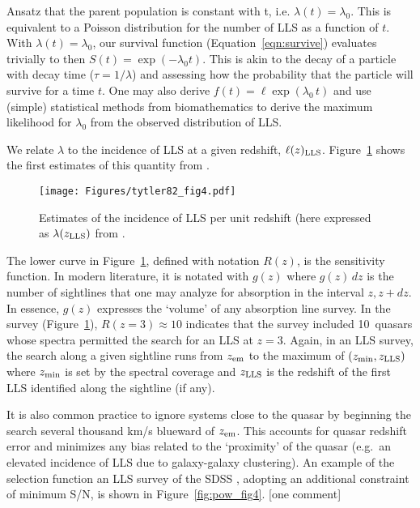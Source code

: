 \documentclass[graybox]{svmult}
\begin{document}
Ansatz that the parent population is constant with t, i.e.
$\lambda(t) = \lambda_0$.  This is equivalent to a Poisson
distribution for the number of LLS as a function of $t$.
With $\lambda(t) = \lambda_0$, our survival function
(Equation~\ref{eqn:survive}) evaluates trivially to 
then $S(t) = \exp(-\lambda_0 t)$.  This is akin to the
decay of a particle with decay time ($\tau = 1/\lambda$)
and assessing how the probability that the particle will
survive for a time $t$.  One may also 
derive $f(t) = \ell \exp(\lambda_0 \, t)$
and use (simple) statistical methods from biomathematics
to derive the maximum likelihood for $\lambda_0$ from the
observed distribution of LLS.

We relate $\lambda$ to the incidence of LLS at a given 
redshift, $\ell(z)_{\rm LLS}$.  
Figure~\ref{fig:t82_fig4} shows the first estimates of
this quantity from \cite{tytler82}. 

%
\begin{figure}[b]
\sidecaption
\texttt{[image: Figures/tytler82\_fig4.pdf]}
%
%
\caption{Estimates of the incidence of LLS per unit
redshift (here expressed as $\lambda(z_{\rm LLS})$ from
\cite{tytler82}.  
}
\label{fig:t82_fig4}       %
\end{figure}

The lower curve in Figure~\ref{fig:t82_fig4}, defined with
notation $R(z)$, is the sensitivity function.  In modern literature,
it is notated with $g(z)$ where
$g(z) \, dz$ is the number of sightlines that one may
analyze for absorption in the interval $z, z+dz$.
In essence,  $g(z)$ expresses the `volume'
of any absorption line survey.  In the \cite{tytler82} survey
(Figure~\ref{fig:t82_fig4}), $R(z=3) \approx 10$ indicates
that the survey included 10~quasars whose spectra permitted
the search for an LLS at $z=3$.
Again, in an LLS survey, the search along a given sightline
runs from  $z_{\rm em}$ to the 
maximum of $(z_{\rm min}, z_{\rm LLS})$ where
$z_{\rm min}$ is set by the spectral coverage and
$z_{\rm LLS}$ is the redshift of the first LLS identified
along the sightline (if any).

It is also common practice to ignore systems close to the quasar
by beginning the search several thousand
km/s blueward of $z_{\rm em}$.  This 
accounts for quasar redshift error and
minimizes any bias related to the `proximity' of the quasar
(e.g.\ an elevated incidence of LLS due to galaxy-galaxy
clustering).
An example of the selection function an LLS survey of the
SDSS \cite{pow10},
adopting an additional constraint of minimum S/N,
is shown in Figure~\ref{fig:pow_fig4}.
[one comment]
\end{document}
